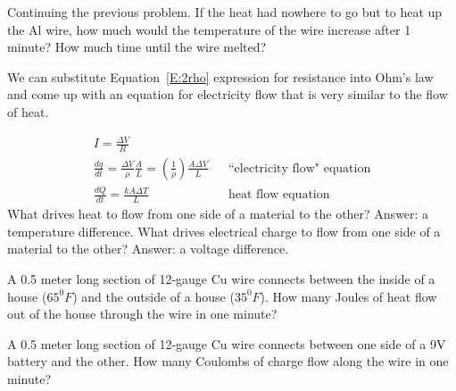\begin{dlevel}
Continuing the previous problem. If the heat had nowhere to go but to heat up the Al wire, how much would the temperature of the wire increase after 1 minute? How much time until the wire melted?
\end{dlevel}

We can substitute Equation~\eqref{E:2rho} expression for resistance into Ohm's law and come up with an equation for electricity flow that is very similar to the flow of heat.

\begin{align*}
I = \frac{\Delta V}{R}	\\
\frac{dq}{dt} = \frac{\Delta V}{\rho}\frac{A}{L}=(\frac{1}{\rho})\frac{A\Delta V}{L}&&	\text{``electricity flow" equation}\\
\frac{dQ}{dt}=	\frac{kA\Delta T}{L}&&				\text{heat flow equation}
\end{align*}
What drives heat to flow from one side of a material to the other? Answer: a temperature difference. What drives electrical charge to flow from one side of a material to the other? Answer: a voltage difference.

\begin{blevel}
A 0.5 meter long section of 12-gauge Cu wire connects between the inside of a house ($65^0 F$) and the outside of a house ($35^0 F$). How many Joules of heat flow out of the house through the wire in one minute?
\end{blevel}

\begin{blevel}
A 0.5 meter long section of 12-gauge Cu wire connects between one side of a 9V battery and the other. How many Coulombs of charge flow along the wire in one minute?
\end{blevel}

